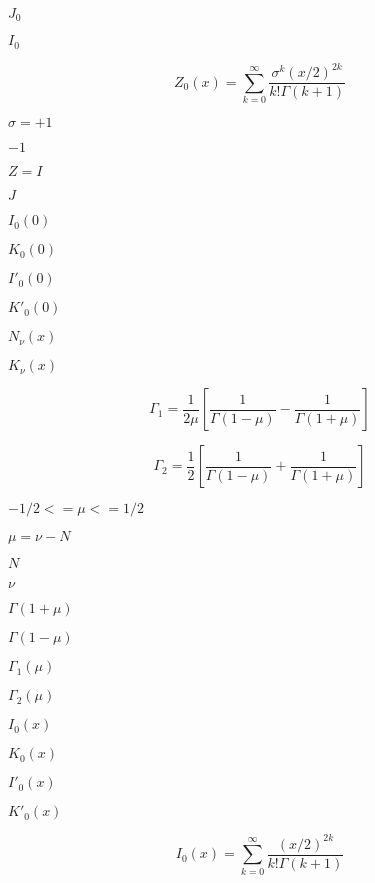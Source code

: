 \documentclass{article}
\begin{document}
$ J_0 $
\pagebreak

$ I_0 $
\pagebreak

\[
 Z_0(x) = \sum_{k=0}^{\infty}
          \frac{\sigma^k (x/2)^{2k}}{k!\Gamma(k+1)}
\]
\pagebreak

$ \sigma = +1 $
\pagebreak

$  -1 $
\pagebreak

$ Z = I $
\pagebreak

$ J $
\pagebreak

$ I_0(0) $
\pagebreak

$ K_0(0) $
\pagebreak

$ I'_0(0) $
\pagebreak

$ K'_0(0) $
\pagebreak

$ N_\nu(x) $
\pagebreak

$ K_\nu(x) $
\pagebreak

\[
  \Gamma_1 = \frac{1}{2\mu}
             [\frac{1}{\Gamma(1 - \mu)} - \frac{1}{\Gamma(1 + \mu)}]
\]
\pagebreak

\[
  \Gamma_2 = \frac{1}{2}
             [\frac{1}{\Gamma(1 - \mu)} + \frac{1}{\Gamma(1 + \mu)}]
\]
\pagebreak

$ -1/2 <= \mu <= 1/2 $
\pagebreak

$ \mu = \nu - N $
\pagebreak

$ N $
\pagebreak

$ \nu $
\pagebreak

$ \Gamma(1 + \mu) $
\pagebreak

$ \Gamma(1 - \mu) $
\pagebreak

$ \Gamma_1(\mu) $
\pagebreak

$ \Gamma_2(\mu) $
\pagebreak

$ I_0(x) $
\pagebreak

$ K_0(x) $
\pagebreak

$ I'_0(x) $
\pagebreak

$ K'_0(x) $
\pagebreak

\[
   I_0(x) = \sum_{k=0}^{\infty}
                \frac{(x/2)^{2k}}{k!\Gamma(k+1)}
 \]
\pagebreak
\end{document}
